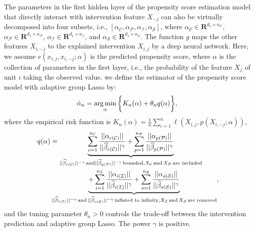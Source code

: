 \documentclass[letterpaper]{article} %
\newcommand{\mb}{\mathbf}
\DeclareMathOperator*{\argmin}{arg\,min}
\theoremstyle{definition}
\theoremstyle{remark}
\begin{document}
The parameters in the first hidden layer of the propensity score estimation model that directly interact with intervention feature $X_{-j}$ can also be virtually decomposed into four subsets, i.e., $[\alpha_\mathcal{C},\alpha_\mathcal{P},\alpha_\mathcal{I},\alpha_\mathcal{S}]$, where  $\alpha_\mathcal{C}  \in \mb{R}^{d_1 \times n_\mathcal{C}}$, $\alpha_\mathcal{P}\in \mb{R}^{d_1 \times n_\mathcal{P}}$, $\alpha_\mathcal{I}\in \mb{R}^{d_1 \times n_\mathcal{I}}$, and $\alpha_\mathcal{S}\in \mb{R}^{d_1 \times n_\mathcal{S}}$. The function $g$ maps the other features $X_{i,-j}$ to the explained intervention $X_{i,j}$ by a deep neural network. Here, we assume $e(x_{i,j}, x_{i,-j};\alpha)$ is the predicted propensity score, where $\alpha$ is the collection of parameters in the first layer, i.e., the probability of the feature $X_j$ of unit $i$ taking the observed value. we define the estimator of the propensity score model with adaptive group Lasso by:
\begin{equation} 
\small
\hat{\alpha}_n = \argmin_{\alpha} \bigg\{K_n(\alpha) + \theta_n q(\alpha)\bigg\},\
\label{ps estimator}
\end{equation}
where the empirical risk function is $K_n(\alpha) = \frac{1}{n}\sum_{i=1}^{n} \ell(X_{i,j},p(X_{i,-j};\alpha))$,
\begin{align}
\small
q(\alpha) & = \underbrace{\sum_{c=1}^{n_\mathcal{C}}\frac{||\alpha_{c(\mathcal{C})}||}{||\widehat{\beta}_{c(\mathcal{C})}||^\gamma}+\sum_{p=1}^{n_\mathcal{P}}\frac{||\alpha_{p(\mathcal{P})}||}{||\widehat{\beta}_{p(\mathcal{P})}||^\gamma}}_{{||\widehat{\beta}_{c(\mathcal{C})}||^{-\gamma}} \, \text{and} {||\widehat{\beta}_{p(\mathcal{P})}||^{-\gamma}} \, \text{bounded}, X_\mathcal{C} \, \text{and} \, X_\mathcal{P} \, \text{are included}} \\
& \underbrace{+\sum_{i=1}^{n_\mathcal{I}}\frac{||\alpha_{i(\mathcal{I})}||}{||\widehat{\beta}_{i(\mathcal{I})}||^\gamma}+\sum_{s=1}^{n_\mathcal{S}}\frac{||\alpha_{s(\mathcal{S})}||}{||\widehat{\beta}_{s(\mathcal{S})}||^\gamma}}_{{||\widehat{\beta}_{i(\mathcal{I})}||^{-\gamma}} \, \text{and} \,{||\widehat{\beta}_{s(\mathcal{S})}||^{-\gamma}} \, \text{inflated to infinity},X_\mathcal{I} \, \text{and} \, X_\mathcal{S} \, \text{are removed}},
\label{Eqn:ps}
\end{align}
and the tuning parameter $\theta_n > 0$ controls the trade-off between the intervention prediction and adaptive group Lasso. The power $\gamma$ is positive. 
\end{document}
